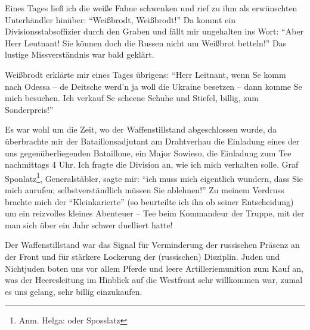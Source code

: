 Eines Tages ließ ich die weiße Fahne schwenken und rief zu ihm als erwünschten Unterhändler hinüber: \enquote{Weißbrodt, Weißbrodt!} Da kommt ein Divisionsstabsoffizier durch den Graben und fällt mir ungehalten ins Wort: \enquote{Aber Herr Leutnant! Sie können doch die Russen nicht um Weißbrot betteln!} Das lustige Missverständnis war bald geklärt.

Weißbrodt erklärte mir eines Tages übrigens: \enquote{Herr Leitnant, wenn Se komm nach Odessa -- de Deitsche werd'n ja woll die Ukraine besetzen -- dann komme Se mich besuchen. Ich verkauf Se scheene Schuhe und Stiefel, billig, zum Sonderpreis!}

Es war wohl um die Zeit, wo der Waffenstillstand abgeschlossen wurde, da überbrachte mir der Bataillonsadjutant am Drahtverhau die Einladung eines der uns gegenüberliegenden Bataillone, ein Major Sowieso, die Einladung zum Tee nachmittags 4 Uhr. Ich fragte die Division an, wie ich mich verhalten solle. Graf Sponlatz\footnote{Anm. Helga: oder Sposslatz}, Generalstäbler, sagte mir: \enquote{ich muss mich eigentlich wundern, dass Sie mich anrufen; selbstverständlich müssen Sie ablehnen!} Zu meinem Verdruss brachte mich der \enquote{Kleinkarierte} (so beurteilte ich ihn ob seiner Entscheidung) um ein reizvolles kleines Abenteuer -- Tee beim Kommandeur der Truppe, mit der man sich über ein Jahr schwer duelliert hatte!

Der Waffenstillstand war das Signal für Verminderung der russischen Präsenz an der Front und für stärkere Lockerung der (russischen) Disziplin. Juden und Nichtjuden boten uns vor allem Pferde und leere Artilleriemunition zum Kauf an, was der Heeresleitung im Hinblick auf die Westfront sehr willkommen war, zumal es uns gelang, sehr billig einzukaufen.

